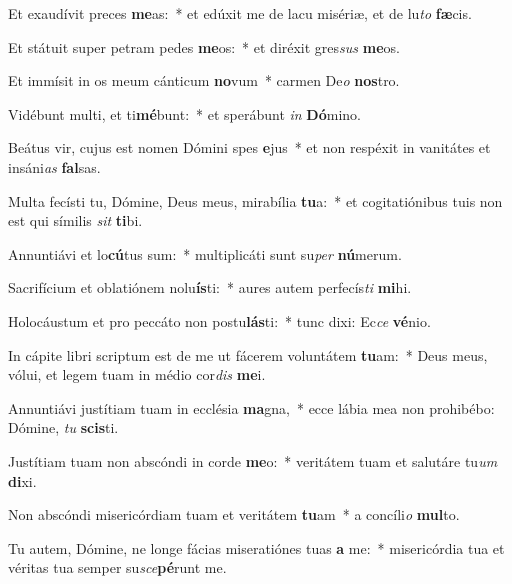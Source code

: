 \item Et exaudívit preces \textbf{me}as:~* et edúxit me de lacu misériæ, et de lu\textit{to} \textbf{fæ}cis.

\item Et státuit super petram pedes \textbf{me}os:~* et diréxit gres\textit{sus} \textbf{me}os.

\item Et immísit in os meum cánticum \textbf{no}vum~* carmen De\textit{o} \textbf{nos}tro.

\item Vidébunt multi, et ti\textbf{mé}bunt:~* et sperábunt \textit{in} \textbf{Dó}mino.

\item Beátus vir, cujus est nomen Dómini spes \textbf{e}jus~* et non respéxit in vanitátes et insáni\textit{as} \textbf{fal}sas.

\item Multa fecísti tu, Dómine, Deus meus, mirabília \textbf{tu}a:~* et cogitatiónibus tuis non est qui símilis \textit{sit} \textbf{ti}bi.

\item Annuntiávi et lo\textbf{cú}tus sum:~* multiplicáti sunt su\textit{per} \textbf{nú}merum.

\item Sacrifícium et oblatiónem nolu\textbf{ís}ti:~* aures autem perfecís\textit{ti} \textbf{mi}hi.

\item Holocáustum et pro peccáto non postu\textbf{lás}ti:~* tunc dixi: Ec\textit{ce} \textbf{vé}nio.

\item In cápite libri scriptum est de me ut fácerem voluntátem \textbf{tu}am:~* Deus meus, vólui, et legem tuam in médio cor\textit{dis} \textbf{me}i.

\item Annuntiávi justítiam tuam in ecclésia \textbf{ma}gna,~* ecce lábia mea non prohibébo: Dómine, \textit{tu} \textbf{scis}ti.

\item Justítiam tuam non abscóndi in corde \textbf{me}o:~* veritátem tuam et salutáre tu\textit{um} \textbf{di}xi.

\item Non abscóndi misericórdiam tuam et veritátem \textbf{tu}am~* a concíli\textit{o} \textbf{mul}to.

\item Tu autem, Dómine, ne longe fácias miseratiónes tuas \textbf{a} me:~* misericórdia tua et véritas tua semper su\textit{sce}\textbf{pé}runt me.

